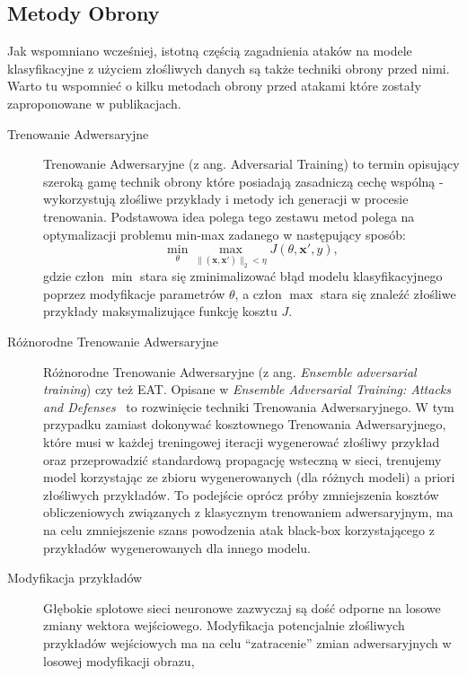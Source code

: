 \documentclass[
    left=2.5cm,         %
    right=2.5cm,        %
    top=2.5cm,          %
    bottom=3cm,         %
    bindingoffset=6mm,  %
    nohyphenation=false %
]{eiti/eiti-thesis}
\renewcommand{\vec}[1]{\mathbf{#1}}
\begin{document}
\newpage

\subsection{Metody Obrony}\label{secition:metody_obrony}
Jak wspomniano wcześniej, istotną częścią zagadnienia ataków na modele klasyfikacyjne z użyciem złośliwych danych są
także techniki obrony przed nimi. Warto tu wspomnieć o kilku metodach obrony przed atakami które zostały
zaproponowane w publikacjach.
\begin{description}
    \item[Trenowanie Adwersaryjne]
    Trenowanie Adwersaryjne (z ang. Adversarial Training)\cite{DBLP:journals/corr/abs-1712-07107} to termin opisujący szeroką gamę technik obrony które posiadają
    zasadniczą cechę wspólną - wykorzystują złośliwe przykłady i metody ich generacji w procesie trenowania.
    Podstawowa idea polega tego zestawu metod polega na optymalizacji problemu min-max zadanego w następujący sposób:
    \begin{equation}
        \min _{\theta} \max _{\|(\vec{x}, \vec{x'})\|_2<\eta} J(\theta, \vec{x'}, y),
    \end{equation}
    gdzie człon $\min$ stara się zminimalizować błąd modelu klasyfikacyjnego poprzez modyfikacje parametrów $\theta$, a człon $\max$ stara się znaleźć
    złośliwe przykłady maksymalizujące funkcję kosztu $J$.
    \item[Różnorodne Trenowanie Adwersaryjne]
        Różnorodne Trenowanie Adwersaryjne (z ang. \textit{Ensemble adversarial training}) czy też EAT. Opisane w \textit{Ensemble Adversarial Training: Attacks and Defenses}~\cite{Tramr2018EnsembleAT} to rozwinięcie
        techniki Trenowania Adwersaryjnego. W tym przypadku zamiast dokonywać kosztownego Trenowania Adwersaryjnego,
        które musi w każdej treningowej iteracji wygenerować złośliwy przykład oraz przeprowadzić standardową propagację wsteczną w sieci,
        trenujemy model korzystając ze zbioru wygenerowanych (dla różnych modeli) a priori złośliwych przykładów.
        To podejście oprócz próby zmniejszenia kosztów obliczeniowych związanych z klasycznym trenowaniem adwersaryjnym, ma na celu
        zmniejszenie szans powodzenia atak black-box korzystającego z przykładów wygenerowanych dla innego modelu.
    \item[Modyfikacja przykładów]
        Głębokie splotowe sieci neuronowe zazwyczaj są dość odporne na losowe zmiany wektora wejściowego.
        Modyfikacja potencjalnie złośliwych przykładów wejściowych ma na celu ``zatracenie'' zmian adwersaryjnych w losowej modyfikacji obrazu,

\end{description}
\end{document}
